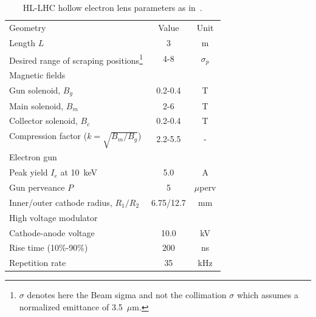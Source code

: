 \documentclass[%
 reprint,
 amsmath,amssymb,
 aps,
prstab,
]{revtex4-1}
\begin{document}
\begin{table}[t]
	\caption{\label{tab:hel_param}%
		HL-LHC hollow electron lens parameters as in~\cite{hel_cdr}.
	}
	\begin{ruledtabular}
		\begin{tabular}{lcc}
			Geometry & Value& Unit\\
			\colrule
			Length $L$    &  3 & m\\
			Desired range of scraping positions\footnote{$\sigma$ denotes here the Beam sigma and not the collimation $\sigma$ which assumes a normalized emittance of 3.5~$\mu$m.} & 4-8 &$\sigma_p$\\
			\colrule
			Magnetic fields & & \\
			\colrule
			Gun solenoid, $B_g$ & 0.2-0.4 & T\\
			Main solenoid, $B_m$ & 2-6 & T\\
			Collector solenoid, $B_c$ & 0.2-0.4 & T\\
			Compression factor ($k=\sqrt{B_m/B_g}$) & 2.2-5.5 & -\\
			\colrule
			Electron gun & & \\
			\colrule
			Peak yield $I_e$ at 10~keV & 5.0 & A\\
			Gun perveance $P$ & 5 & $\mu$perv\\
			Inner/outer cathode radius, $R_1/R_2$ & 6.75/12.7 & mm\\
			\colrule
			High voltage modulator & & \\
			\colrule
			Cathode-anode voltage & 10.0 & kV\\
			Rise time (10\%-90\%) & 200 & ns \\
			Repetition rate & 35 & kHz
		\end{tabular}
	\end{ruledtabular}
\end{table}
\end{document}

